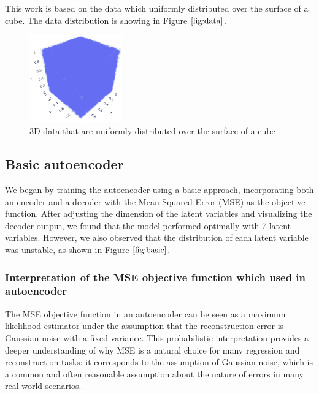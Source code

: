 \documentclass{article}
\begin{document}
This work is based on the data which uniformly distributed over the surface of a cube. 
The data distribution is showing in Figure $\ref{fig:data}$.

\begin{figure}[htb]
  \begin{minipage}[b]{1.0\linewidth}
    \centering
    \centerline{\includegraphics[width=4.0cm]{images/data}}
  \end{minipage}
  \caption{3D data that are uniformly distributed over the surface of a cube}
  \label{fig:data}
  \end{figure}

\subsection{Basic autoencoder}
\label{ssec:basicautoencoder}

We began by training the autoencoder using a basic approach, incorporating both an encoder and a decoder with the Mean Squared Error (MSE) as the objective function. After adjusting the dimension of the latent variables and visualizing the decoder output, we found that the model performed optimally with 7 latent variables. However, we also observed that the distribution of each latent variable was unstable, as shown in Figure $\ref{fig:basic}$.

\subsubsection{Interpretation of the MSE objective function which used in autoencoder}
\label{sssec:mse}
The MSE objective function in an autoencoder can be seen as a maximum likelihood estimator under the assumption that the reconstruction error is Gaussian noise with a fixed variance. This probabilistic interpretation provides a deeper understanding of why MSE is a natural choice for many regression and reconstruction tasks: it corresponds to the assumption of Gaussian noise, which is a common and often reasonable assumption about the nature of errors in many real-world scenarios.
\end{document}
